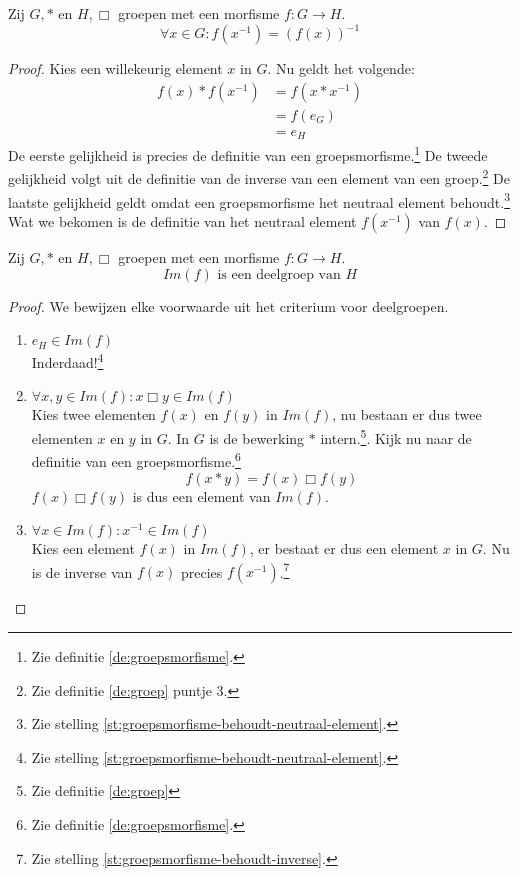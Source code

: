 \documentclass[main.tex]{subfiles}
\begin{document}
\begin{st}
  \label{st:groepsmorfisme-behoudt-inverse}
  Zij $G,*$ en $H,\Box$ groepen met een morfisme $f: G \rightarrow H$.
  \[ \forall x \in G: f(x^{-1}) = (f(x))^{-1} \]

  \begin{proof}
    Kies een willekeurig element $x$ in $G$.
    Nu geldt het volgende:
    \[
    \begin{array}{rl}
    f(x) * f(x^{-1}) &= f(x*x^{-1})\\
                    &= f(e_{G})\\
                    &= e_{H}
    \end{array}
    \]
    De eerste gelijkheid is precies de definitie van een groepsmorfisme.\footnote{Zie definitie \ref{de:groepsmorfisme}.}
    De tweede gelijkheid volgt uit de definitie van de inverse van een element van een groep.\footnote{Zie definitie \ref{de:groep} puntje 3.}
    De laatste gelijkheid geldt omdat een groepsmorfisme het neutraal element behoudt.\footnote{Zie stelling \ref{st:groepsmorfisme-behoudt-neutraal-element}.}
    Wat we bekomen is de definitie van het neutraal element $f(x^{-1})$ van $f(x)$.
  \end{proof}
\end{st}

\begin{st}
  \label{st:beeld-is-deelgroep}
  Zij $G,*$ en $H,\Box$ groepen met een morfisme $f: G \rightarrow H$.
  \[ Im(f) \text{ is een deelgroep van } H \]

  \begin{proof}
    We bewijzen elke voorwaarde uit het criterium voor deelgroepen.
    \begin{enumerate}
    \item $e_{H} \in Im(f)$\\
      Inderdaad!\footnote{Zie stelling \ref{st:groepsmorfisme-behoudt-neutraal-element}.}
    \item $\forall x,y \in Im(f): x \Box y \in Im(f)$\\
      Kies twee elementen $f(x)$ en $f(y)$ in $Im(f)$, nu bestaan er dus twee elementen $x$ en $y$ in $G$.
      In $G$ is de bewerking $*$ intern.\footnote{Zie definitie \ref{de:groep}}.
      Kijk nu naar de definitie van een groepsmorfisme.\footnote{Zie definitie \ref{de:groepsmorfisme}.}
      \[ f(x*y) = f(x) \Box f(y) \]
      $f(x) \Box f(y)$ is dus een element van $Im(f)$.
    \item $\forall x \in Im(f): x^{-1} \in Im(f)$\\
      Kies een element $f(x)$ in $Im(f)$, er bestaat er dus een element $x$ in $G$.
      Nu is de inverse van $f(x)$ precies $f(x^{-1})$.\footnote{Zie stelling \ref{st:groepsmorfisme-behoudt-inverse}.}
    \end{enumerate}
  \end{proof}
\end{st}
\end{document}
